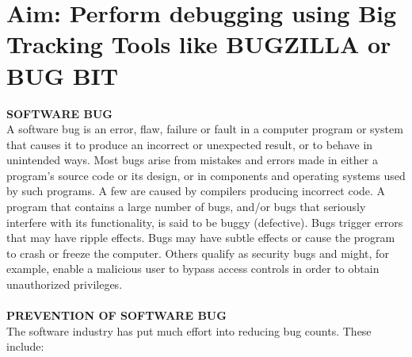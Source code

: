 
\section*{\fontsize{16}{14}\selectfont Aim: Perform debugging using Big Tracking Tools like BUGZILLA or BUG BIT}

\textbf{SOFTWARE BUG}\\
A software bug is an error, flaw, failure or fault in a computer program or system that causes it to produce an incorrect or unexpected result, or to behave in unintended ways. Most bugs arise from mistakes and errors made in either a program's source code or its design, or in components and operating systems used by such programs. A few are caused by compilers producing incorrect code. A program that contains a large number of bugs, and/or bugs that seriously interfere with its functionality, is said to be buggy (defective).
Bugs trigger errors that may have ripple effects. Bugs may have subtle effects or cause the program to crash or freeze the computer. Others qualify as security bugs and might, for example, enable a malicious user to bypass access controls in order to obtain unauthorized privileges.\\\\
\textbf{PREVENTION OF SOFTWARE BUG}\\
The software industry has put much effort into reducing bug counts. These include:
